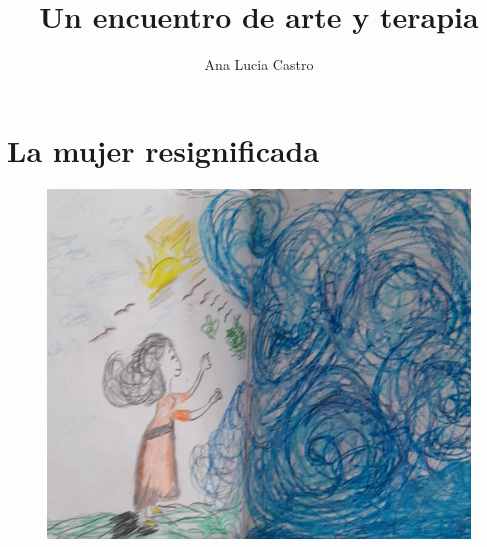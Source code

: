 \documentclass[12pt, a4paper, twoside]{book} %
\author{Ana Lucia Castro}
\title{\textbf{Un encuentro de arte y terapia}}
\date{}
\begin{document}
\maketitle
\thispagestyle{empty} %

\tableofcontents

\chapter{La mujer resignificada}

\begin{figure}[H]
	\centering
	\includegraphics[width=\textwidth]{./images/1f81324df3940b.jpg}
\end{figure}

\clearpage
\end{document}
